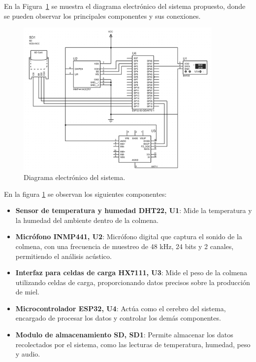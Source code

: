 En la Figura~\ref{fig:diagrama_electronico} se muestra el diagrama electrónico del sistema propuesto, donde se pueden observar los principales componentes y sus conexiones.

\begin{figure}[H]
    \centering
    \includegraphics[width=0.9\textwidth]{assets/cap_3/diagrama_electronico.png}
    \caption{Diagrama electrónico del sistema.}
    \label{fig:diagrama_electronico}
\end{figure}

En la figura \ref{fig:diagrama_electronico} se observan los siguientes componentes:
\begin{itemize}
    \item \textbf{Sensor de temperatura y humedad DHT22, U1}: Mide la temperatura y la humedad del ambiente dentro de la colmena.
    \item \textbf{Micrófono INMP441, U2}: Micrófono digital que captura el sonido de la colmena, con una frecuencia de muestreo de 48 kHz, 24 bits y 2 canales, permitiendo el análisis acústico.
    \item \textbf{Interfaz para celdas de carga HX7111, U3}: Mide el peso de la colmena utilizando celdas de carga, proporcionando datos precisos sobre la producción de miel.
    \item \textbf{Microcontrolador ESP32, U4}: Actúa como el cerebro del sistema, encargado de procesar los datos y controlar los demás componentes.
    \item \textbf{Modulo de almacenamiento SD, SD1}: Permite almacenar los datos recolectados por el sistema, como las lecturas de temperatura, humedad, peso y audio.
\end{itemize}